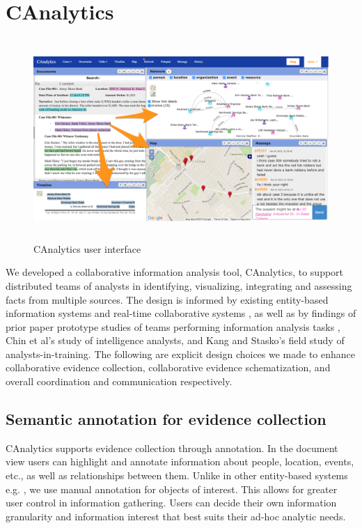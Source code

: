 \section{CAnalytics}
\begin{figure}
	\centering
	\includegraphics[height=3in]{img/ca_annotation}
	\caption{CAnalytics user interface}
	\label{fig:canalytics}
\end{figure}

We developed a collaborative information analysis tool, CAnalytics, to support distributed teams of analysts in identifying, visualizing, integrating and assessing facts from multiple sources. The design is informed by existing entity-based information systems \cite{Bier2010} and real-time collaborative systems \cite{Goyal2014}, as well as by findings of prior paper prototype studies of teams performing information analysis tasks \cite{Carroll2013}, Chin et al's \cite{Chin2009} study of intelligence analysts, and Kang and Stasko's \cite{Kang2011} field study of analysts-in-training. The following are explicit design choices we made to enhance collaborative evidence collection, collaborative evidence schematization, and overall coordination and communication respectively. 


\subsection{Semantic annotation for evidence collection}
CAnalytics supports evidence collection through annotation. In the document view users can highlight and annotate information about people, location, events, etc., as well as relationships between them. Unlike in other entity-based systems e.g. \cite{Bier2010}, we use manual annotation for objects of interest. This allows for greater user control in information gathering. Users can decide their own information granularity and information interest that best suits their ad-hoc analytic needs. 

